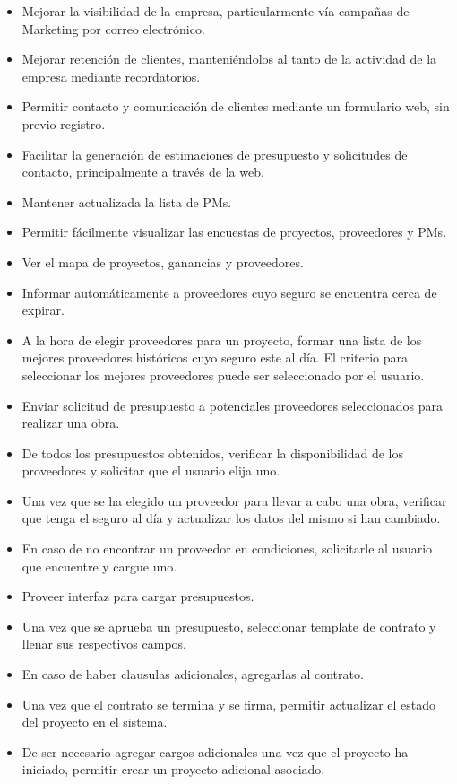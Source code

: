 \documentclass{article}
\theoremstyle{definition}
\theoremstyle{remark}
\begin{document}
\begin{itemize}
    \item Mejorar la visibilidad de la empresa, particularmente vía campañas de Marketing por correo electrónico.
    \item Mejorar retención de clientes, manteniéndolos al tanto de la actividad de la empresa mediante recordatorios.
    \item Permitir contacto y comunicación de clientes mediante un formulario web, sin previo registro.
    \item Facilitar la generación de estimaciones de presupuesto y solicitudes de contacto, principalmente a través de la web.
    \item Mantener actualizada la lista de PMs.
    \item Permitir fácilmente visualizar las encuestas de proyectos, proveedores y PMs.
    \item Ver el mapa de proyectos, ganancias y proveedores.
    \item Informar automáticamente a proveedores cuyo seguro se encuentra cerca de expirar.
    \item A la hora de elegir proveedores para un proyecto, formar una lista de los mejores proveedores históricos cuyo seguro este al día. El criterio para seleccionar los mejores proveedores puede ser seleccionado por el usuario.
    \item Enviar solicitud de presupuesto a potenciales proveedores seleccionados para realizar una obra.
    \item De todos los presupuestos obtenidos, verificar la disponibilidad de los proveedores y solicitar que el usuario elija uno.
    \item Una vez que se ha elegido un proveedor para llevar a cabo una obra, verificar que tenga el seguro al día y actualizar los datos del mismo si han cambiado.
    \item En caso de no encontrar un proveedor en condiciones, solicitarle al usuario que encuentre y cargue uno.
    \item Proveer interfaz para cargar presupuestos.
    \item Una vez que se aprueba un presupuesto, seleccionar template de contrato y llenar sus respectivos campos.
    \item En caso de haber clausulas adicionales, agregarlas al contrato.
    \item Una vez que el contrato se termina y se firma, permitir actualizar el estado del proyecto en el sistema.
    \item De ser necesario agregar cargos adicionales una vez que el proyecto ha iniciado, permitir crear un proyecto adicional asociado.

\end{itemize}
\end{document}
